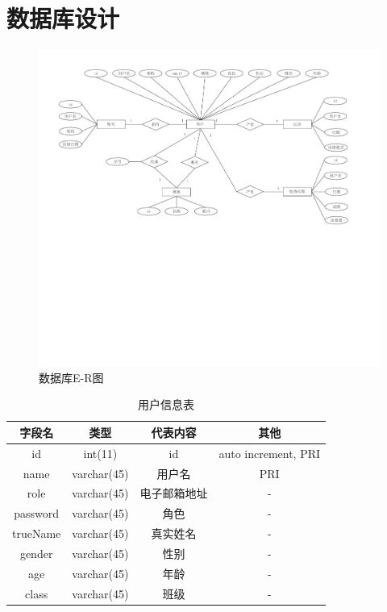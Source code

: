 \section{数据库设计}

\begin{figure}[h!]
	\centering
	\includegraphics[width=350bp]{picture/E-R.pdf}
	\caption{数据库E-R图}
	\label{fig:}
\end{figure}
\par

\begin{table}[h!]
\begin{center}
\caption{用户信息表}
\begin{tabular}{|c|c|c|c|}
 \hline
 字段名 & 类型 & 代表内容 & 其他\\
 \hline
id & int(11) & id & auto increment, PRI \\
 \hline
name & varchar(45) & 用户名 & PRI \\
 \hline
role & varchar(45) & 电子邮箱地址 & - \\
 \hline
 password & varchar(45) & 角色 & - \\
  \hline
 trueName & varchar(45) & 真实姓名& - \\
  \hline
 gender & varchar(45) & 性别 & - \\
  \hline
  age & varchar(45) & 年龄 & - \\
  \hline
  class & varchar(45) & 班级 & - \\
  \hline
\end{tabular}
\end{center}
\end{table}
\par

